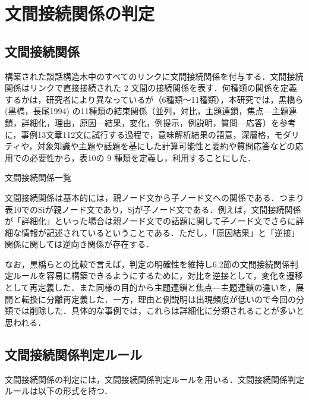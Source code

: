 \documentclass[japanese]{jnlp_1.4}
\begin{document}
\section{文間接続関係の判定}
\label{sec:mylabel14}

\subsection{文間接続関係}
\label{sec:mylabel15}

構築された談話構造木中のすべてのリンクに文間接続関係を付与する．文間接続関係はリンクで直接接続された 2 文間の接続関係を表す．何種類の関係を定義するかは，研究者により異なっているが（6種類〜11種類），本研究では，黒橋ら (黒橋，長尾1994) の11種類の結束関係（並列，対比，主題連鎖，焦点—主題連鎖，詳細化，理由，原因—結果，変化，例提示，例説明，質問—応答）を参考に，事例13文章112文に試行する過程で，意味解析結果の語意，深層格，モダリティや，対象知識や主題や話題を基にした計算可能性と要約や質問応答などの応用での必要性から，表10の 9 種類を定義し，利用することにした．

\begin{table}[b]
\vspace{-1\baselineskip}
\caption{文間接続関係一覧}

\end{table}

文間接続関係は基本的には，親ノード文から子ノード文への関係である．つまり表10でのSiが親ノード文であり，Sjが子ノード文である．例えば，文間接続関係が「詳細化」といった場合は親ノード文での話題に関して子ノード文でさらに詳細な情報が記述されているということである．ただし，「原因結果」と「逆接」関係に関しては逆向き関係が存在する．

なお，黒橋らとの比較で言えば，判定の明確性を維持し6.2節の文間接続関係判定ルールを容易に構築できるようにするために，対比を逆接として，変化を遷移として再定義した．また同様の目的から主題連鎖と焦点—主題連鎖の違いを，展開と転換に分離再定義した．一方，理由と例説明は出現頻度が低いので今回の分類では削除した．具体的な事例では，これらは詳細化に分類されることが多いと思われる．


\subsection{文間接続関係判定ルール}
\label{sec:mylabel16}

文間接続関係の判定には，文間接続関係判定ルールを用いる．文間接続関係判定ルールは以下の形式を持つ．
\vspace{1\baselineskip}
\end{document}
